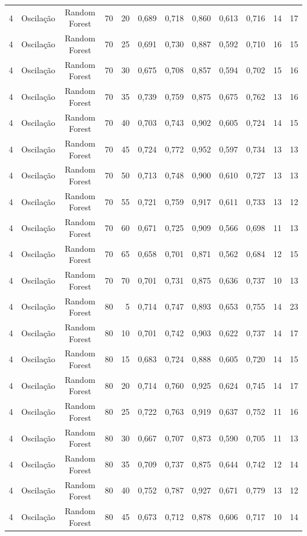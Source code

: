 \begin{longtable}{ccclrrrrrrrr}
4 & Oscilação & Random Forest & 70 & 20 & 0,689 & 0,718 & 0,860 & 0,613 & 0,716 & 14 & 17 \\
4 & Oscilação & Random Forest & 70 & 25 & 0,691 & 0,730 & 0,887 & 0,592 & 0,710 & 16 & 15 \\
4 & Oscilação & Random Forest & 70 & 30 & 0,675 & 0,708 & 0,857 & 0,594 & 0,702 & 15 & 16 \\
4 & Oscilação & Random Forest & 70 & 35 & 0,739 & 0,759 & 0,875 & 0,675 & 0,762 & 13 & 16 \\
4 & Oscilação & Random Forest & 70 & 40 & 0,703 & 0,743 & 0,902 & 0,605 & 0,724 & 14 & 15 \\
4 & Oscilação & Random Forest & 70 & 45 & 0,724 & 0,772 & 0,952 & 0,597 & 0,734 & 13 & 13 \\
4 & Oscilação & Random Forest & 70 & 50 & 0,713 & 0,748 & 0,900 & 0,610 & 0,727 & 13 & 13 \\
4 & Oscilação & Random Forest & 70 & 55 & 0,721 & 0,759 & 0,917 & 0,611 & 0,733 & 13 & 12 \\
4 & Oscilação & Random Forest & 70 & 60 & 0,671 & 0,725 & 0,909 & 0,566 & 0,698 & 11 & 13 \\
4 & Oscilação & Random Forest & 70 & 65 & 0,658 & 0,701 & 0,871 & 0,562 & 0,684 & 12 & 15 \\
4 & Oscilação & Random Forest & 70 & 70 & 0,701 & 0,731 & 0,875 & 0,636 & 0,737 & 10 & 13 \\
4 & Oscilação & Random Forest & 80 & 5 & 0,714 & 0,747 & 0,893 & 0,653 & 0,755 & 14 & 23 \\
4 & Oscilação & Random Forest & 80 & 10 & 0,701 & 0,742 & 0,903 & 0,622 & 0,737 & 14 & 17 \\
4 & Oscilação & Random Forest & 80 & 15 & 0,683 & 0,724 & 0,888 & 0,605 & 0,720 & 14 & 15 \\
4 & Oscilação & Random Forest & 80 & 20 & 0,714 & 0,760 & 0,925 & 0,624 & 0,745 & 14 & 17 \\
4 & Oscilação & Random Forest & 80 & 25 & 0,722 & 0,763 & 0,919 & 0,637 & 0,752 & 11 & 16 \\
4 & Oscilação & Random Forest & 80 & 30 & 0,667 & 0,707 & 0,873 & 0,590 & 0,705 & 11 & 13 \\
4 & Oscilação & Random Forest & 80 & 35 & 0,709 & 0,737 & 0,875 & 0,644 & 0,742 & 12 & 14 \\
4 & Oscilação & Random Forest & 80 & 40 & 0,752 & 0,787 & 0,927 & 0,671 & 0,779 & 13 & 12 \\
4 & Oscilação & Random Forest & 80 & 45 & 0,673 & 0,712 & 0,878 & 0,606 & 0,717 & 10 & 14 \\

\end{longtable}
